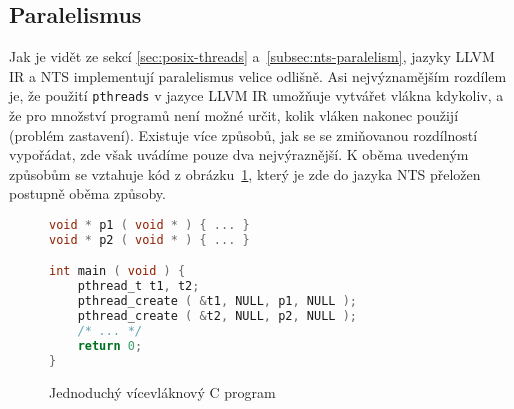 \documentclass[12pt]{fithesis2}
\begin{document}
\subsection{Paralelismus}
\label{subsec:paralelism}
Jak je vidět ze sekcí \ref{sec:posix-threads} a~\ref{subsec:nts-paralelism}, jazyky LLVM IR a NTS implementují paralelismus velice odlišně. Asi nejvýznamějším rozdílem je, že použití \texttt{pthreads} v jazyce LLVM IR umožňuje vytvářet vlákna kdykoliv, a že pro množství programů není možné určit, kolik vláken nakonec použijí (problém zastavení).
Existuje více způsobů, jak se se zmiňovanou rozdílností vypořádat, zde však uvádíme pouze dva nejvýraznější. K oběma uvedeným způsobům se vztahuje kód z obrázku~\ref{fig:llvm2nts:simple-c:orig}, který je zde do jazyka NTS přeložen postupně oběma způsoby.

\begin{figure}[h]
\begin{lstlisting}[language=C]
void * p1 ( void * ) { ... }
void * p2 ( void * ) { ... }

int main ( void ) {
	pthread_t t1, t2;
	pthread_create ( &t1, NULL, p1, NULL );
	pthread_create ( &t2, NULL, p2, NULL );
	/* ... */
	return 0;
}
\end{lstlisting}
\caption{Jednoduchý vícevláknový C program}
\label{fig:llvm2nts:simple-c:orig}
\end{figure}
\end{document}
